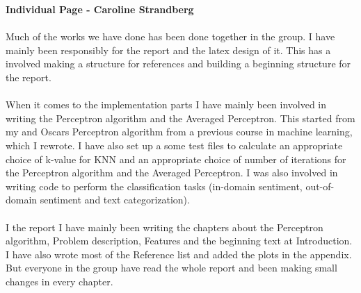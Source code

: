 \newpage
\textbf{Individual Page - Caroline Strandberg} \\\\
Much of the works we have done has been done together in the group. 
I have mainly been responsibly for the report and the latex design of it. This has a involved making a structure for references and building a beginning structure for the report.   
\\\\
When it comes to the implementation parts I have mainly been involved in writing the Perceptron algorithm and the Averaged Perceptron. This started from my and Oscars Perceptron algorithm from a previous course in machine learning, which I rewrote. I have also set up a some test files to calculate an appropriate choice of k-value for KNN and an appropriate choice of number of iterations for the Perceptron algorithm and the Averaged Perceptron. I was also involved in writing code to perform the classification tasks (in-domain sentiment, out-of-domain sentiment and text categorization).
\\\\
I the report I have mainly been writing the chapters about the Perceptron algorithm, Problem description, Features and the beginning text at Introduction. I have also wrote most of the Reference list and added the plots in the appendix. But everyone in the group have read the whole report and been making small changes in every chapter. 
